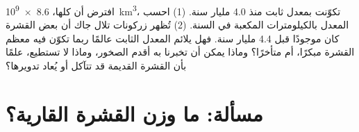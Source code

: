 \begin{exercise}[$\star\star\star$]\label{exo:g12:continental-crust:15}
افترض أن  كلها، \qty{8.6e9}{km^3}، تكوّنت بمعدل
ثابت منذ 4.0 مليار سنة. (1) احسب المعدل بالكيلومترات المكعبة في
السنة. (2) تُظهر زركونات تلال جاك أن بعض القشرة كان موجودًا قبل
4.4 مليار سنة. فهل يلائم المعدل الثابت عالمًا ربما تكوّن فيه معظم
القشرة مبكرًا، أم متأخرًا؟ وماذا يمكن أن تخبرنا به أقدم الصخور، وماذا
لا تستطيع، علمًا بأن القشرة القديمة قد تتآكل أو يُعاد تدويرها؟
\end{exercise}

\section{مسألة: ما وزن القشرة القارية؟}

